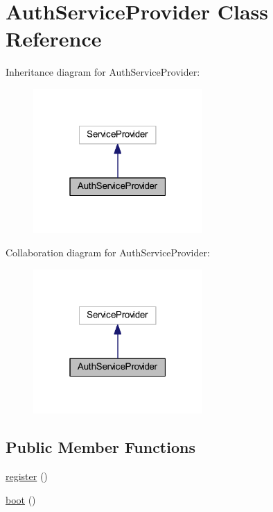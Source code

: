 \hypertarget{class_app_1_1_providers_1_1_auth_service_provider}{}\section{Auth\+Service\+Provider Class Reference}
\label{class_app_1_1_providers_1_1_auth_service_provider}


Inheritance diagram for Auth\+Service\+Provider\+:
\nopagebreak
\begin{figure}[H]
\begin{center}
\leavevmode
\includegraphics[width=183pt]{class_app_1_1_providers_1_1_auth_service_provider__inherit__graph}
\end{center}
\end{figure}


Collaboration diagram for Auth\+Service\+Provider\+:
\nopagebreak
\begin{figure}[H]
\begin{center}
\leavevmode
\includegraphics[width=183pt]{class_app_1_1_providers_1_1_auth_service_provider__coll__graph}
\end{center}
\end{figure}
\subsection*{Public Member Functions}
\begin{DoxyCompactItemize}
\item 
\mbox{\hyperlink{class_app_1_1_providers_1_1_auth_service_provider_acc294a6cc8e69743746820e3d15e3f78}{register}} ()
\item 
\mbox{\hyperlink{class_app_1_1_providers_1_1_auth_service_provider_a8814ea4b5beba763c570b4818980814e}{boot}} ()
\end{DoxyCompactItemize}


